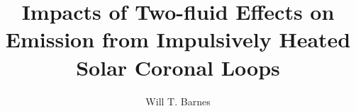 \documentclass[12pt]{ruthesis}
\title{Impacts of Two-fluid Effects on Emission from Impulsively Heated Solar Coronal Loops}
\author{Will T. Barnes}
\begin{document}
  \begin{frontmatter}
   \maketitle
   
   \tableofcontents
   \listoffigures
   \listoftables
%   
  \end{frontmatter}









\appendix

%
%
%
%



\end{document}

